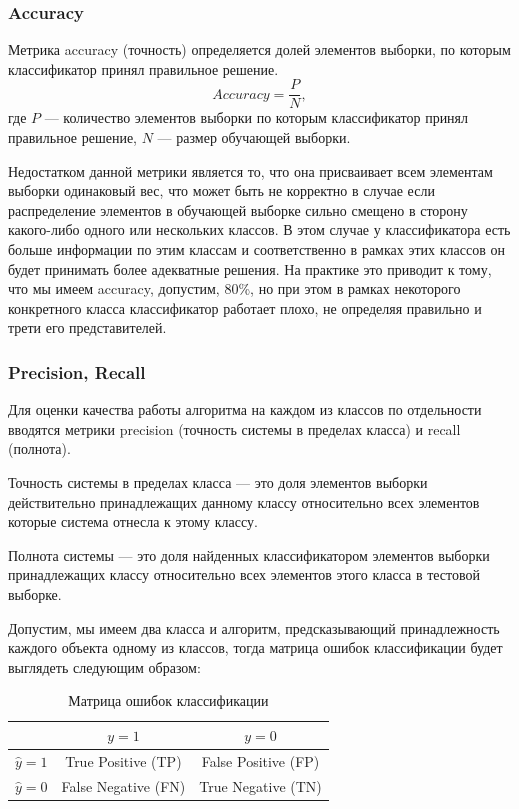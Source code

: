 \documentclass[14pt, a4paper, oneside]{extarticle}
\begin{document}
\subsubsection{Accuracy}
Метрика accuracy (точность) определяется долей элементов выборки, по которым классификатор принял правильное решение.
$$Accuracy = \frac{P}{N},$$
где $P$ --- количество элементов выборки по которым классификатор принял правильное решение, $N$ --- размер обучающей выборки.

Недостатком данной метрики является то, что она присваивает всем элементам выборки одинаковый вес, что может быть не корректно в случае если распределение элементов в обучающей выборке сильно смещено в сторону какого-либо одного или нескольких классов. В этом случае у классификатора есть больше информации по этим классам и соответственно в рамках этих классов он будет принимать более адекватные решения. На практике это приводит к тому, что мы имеем accuracy, допустим, 80\%, но при этом в рамках некоторого конкретного класса классификатор работает плохо, не определяя правильно и трети его представителей.

\subsubsection{Precision, Recall}
Для оценки качества работы алгоритма на каждом из классов по отдельности вводятся метрики precision (точность системы в пределах класса) и recall (полнота).

Точность системы в пределах класса --- это доля элементов выборки действительно принадлежащих данному классу относительно всех элементов которые система отнесла к этому классу.

Полнота системы --- это доля найденных классификатором элементов выборки принадлежащих классу относительно всех элементов этого класса в тестовой выборке.

Допустим, мы имеем два класса и алгоритм, предсказывающий принадлежность каждого объекта одному из классов, тогда матрица ошибок классификации будет выглядеть следующим образом:

\begin{table}[H]
    \centering
    \caption{Матрица ошибок классификации}
    \begin{tabular}{ |c|c|c| }
        \hline
        & $y=1$ & $y=0$ \\
        \hline
        $\hat{y}=1$ & True Positive (TP) & False Positive (FP) \\
        \hline
        $\hat{y}=0$ & False Negative (FN) & True Negative (TN) \\
        \hline
    \end{tabular}
\end{table}
\end{document}
